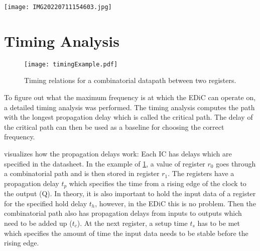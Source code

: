 \begin{sidewaysfigure}[p]
  \centering
  \texttt{[image: IMG20220711154603.jpg]}
  \caption{\gls{EDiC} \gls{PCB} with the two test adapter boards.}
  \label{fig:EDiC_TestAdapter}
\end{sidewaysfigure}
\section{Timing Analysis}\label{sec:timing}
\begin{figure}[t]
  \centering
  \texttt{[image: timingExample.pdf]}
  \caption{Timing relations for a combinatorial datapath between two registers.}
  \label{fig:timingExample}
\end{figure}
To figure out what the maximum frequency is at which the \gls{EDiC} can operate on, a detailed timing analysis was performed.
The timing analysis computes the path with the longest propagation delay which is called the critical path.
The delay of the critical path can then be used as a baseline for choosing the correct frequency.

 visualizes how the propagation delays work:
Each \gls{IC} has delays which are specified in the datasheet.
In the example of \cref{fig:timingExample}, a value of register $r_0$ goes through a combinatorial path and is then stored in register $r_1$.
The registers have a propagation delay $t_p$ which specifies the time from a rising edge of the clock to the output (Q).
In theory, it is also important to hold the input data of a register for the specified hold delay $t_h$, however, in the \gls{EDiC} this is no problem.
Then the combinatorial path also has propagation delays from inputs to outputs which need to be added up ($t_c$).
At the next register, a setup time $t_s$ has to be met which specifies the amount of time the input data needs to be stable before the rising edge.

